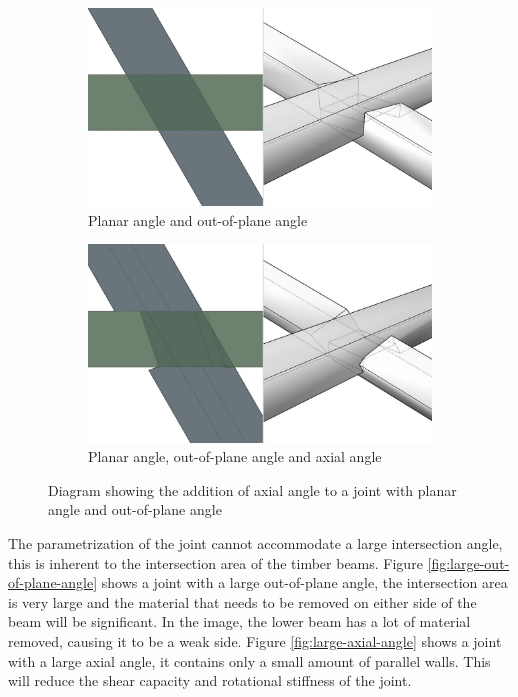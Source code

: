 \begin{figure}[!h]
    \centering
    \begin{subfigure}[b]{0.49\textwidth}
        \centering
        \includegraphics[width=\textwidth]{images/7a/img19.jpg}
        \caption{Planar angle and out-of-plane angle}
        \label{fig:no-axial-angle-yet}
    \end{subfigure}
    \hfill
    \begin{subfigure}[b]{0.49\textwidth}
        \centering
        \includegraphics[width=\textwidth]{images/7a/img20.jpg}
        \caption{Planar angle, out-of-plane angle and axial angle}
        \label{fig:axial-angle-added}
    \end{subfigure}
    \caption{Diagram showing the addition of axial angle to a joint with planar angle and out-of-plane angle}
    \label{fig:axial-angle}
\end{figure}

The parametrization of the joint cannot accommodate a large intersection angle, this is inherent to the intersection area of the timber beams. Figure \ref{fig:large-out-of-plane-angle} shows a joint with a large out-of-plane angle, the intersection area is very large and the material that needs to be removed on either side of the beam will be significant. In the image, the lower beam has a lot of material removed, causing it to be a weak side. Figure \ref{fig:large-axial-angle} shows a joint with a large axial angle, it contains only a small amount of parallel walls. This will reduce the shear capacity and rotational stiffness of the joint.

